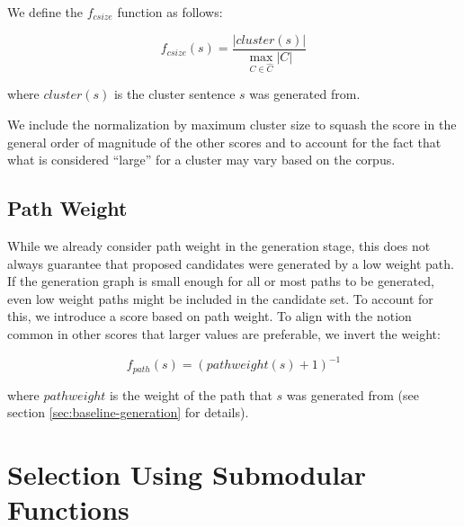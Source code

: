 \documentclass[a4paper,BCOR=10mm]{report}
\numberwithin{lemma}{chapter}
\numberwithin{definition}{chapter}
\begin{document}
We define the $f_{\mathit{csize}}$ function as follows:

\begin{equation}
f_{\mathit{csize}}(s) = \frac{|\mathit{cluster}(s)|}{\max_{C \in \widehat{C}}{|C|}}
\end{equation}

where $\mathit{cluster}(s)$ is the cluster sentence $s$ was generated from.

We include the normalization by maximum cluster size to squash the score in the general order of magnitude of the other scores and to account for the fact that what is considered ``large'' for a cluster may vary based on the corpus.


\subsection{Path Weight}

While we already consider path weight in the generation stage, this does not always guarantee that proposed candidates were generated by a low weight path. If the generation graph is small enough for all or most paths to be generated, even low weight paths might be included in the candidate set.
To account for this, we introduce a score based on path weight. To align with the notion common in other scores that larger values are preferable, we invert the weight:

\begin{equation}
f_{path}(s) = (\mathit{pathweight}(s) + 1)^{-1}
\end{equation}

where $\mathit{pathweight}$ is the weight of the path that $s$ was generated from (see section \ref{sec:baseline-generation} for details).


\section{Selection Using Submodular Functions} \label{sec:system-selection}

\end{document}

